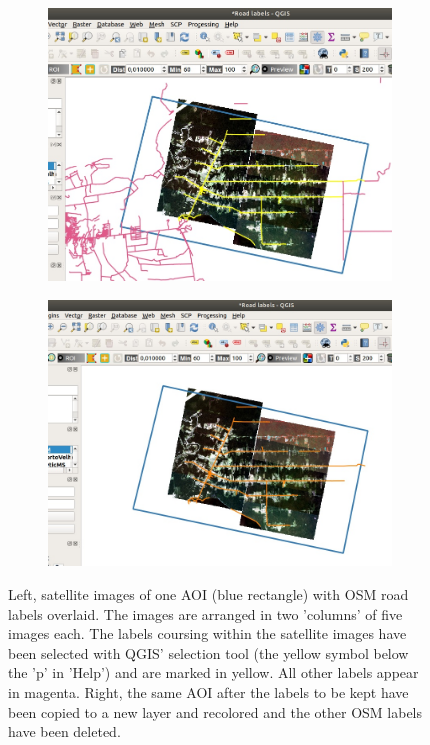 \documentclass[12pt,a4paper]{scrartcl}
\begin{document}
\begin{figure}
	\begin{subfigure}{0.49\textwidth}
		\includegraphics[width=0.99\linewidth]{marking_OSM_labels01.jpg}
	\end{subfigure} 
	\begin{subfigure}{0.49\textwidth}
		\includegraphics[width=0.99\linewidth]{marking_OSM_labels02.jpg}
	\end{subfigure} 
	\caption{Left, satellite images of one AOI (blue rectangle) with OSM road labels overlaid. The images are arranged in two 'columns' of five images each. The labels coursing within the satellite images have been selected with QGIS' selection tool (the yellow symbol below the 'p' in 'Help') and are marked in yellow. All other labels appear in magenta. Right, the same AOI after the labels to be kept have been copied to a new layer and recolored and the other OSM labels have been deleted.}
	\label{fig:mark_osm_label}
\end{figure}
\end{document}
